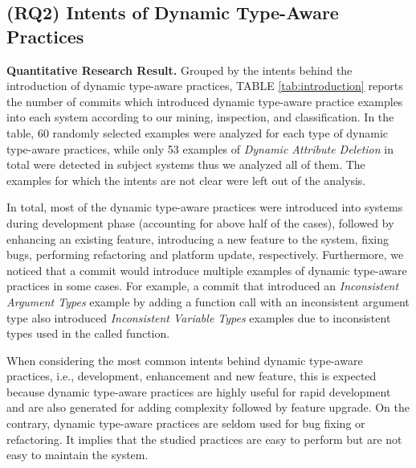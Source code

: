 \subsection{(RQ2) Intents of Dynamic Type-Aware Practices}

\textbf{Quantitative Research Result.}
Grouped by the intents behind the introduction of dynamic type-aware practices, TABLE \ref{tab:introduction} reports the number of commits which introduced dynamic type-aware practice examples into each system according to our mining, inspection, and classification. 
In the table, 60 randomly selected examples were analyzed for each type of dynamic type-aware practices, while only 53 examples of \emph{Dynamic Attribute Deletion} in total were detected in subject systems thus we analyzed all of them. The examples for which the intents are not clear were left out of the analysis.

In total, most of the dynamic type-aware practices were introduced into systems during development phase (accounting for above half of the cases), followed by enhancing an existing feature, introducing a new feature to the system, fixing bugs, performing refactoring and platform update, respectively. Furthermore, we noticed that a commit would introduce multiple examples of dynamic type-aware practices in some cases. For example, a commit that introduced an \emph{Inconsistent Argument Types} example by adding a function call with an inconsistent argument type also introduced \emph{Inconsistent Variable Types} examples due to inconsistent types used in the called function.


When considering the most common intents behind dynamic type-aware practices, i.e., development, enhancement and new feature, this is expected because dynamic type-aware practices are highly useful for rapid development and are also generated for adding complexity followed by feature upgrade. On the contrary, dynamic type-aware practices are seldom used for bug fixing or refactoring. It implies that the studied practices are easy to perform but are not easy to maintain the system. 



